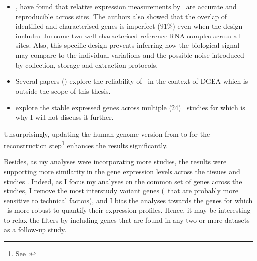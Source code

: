 \begin{itemize}[topsep=0pt,nosep]
subsets of \gtex\ and \tcga\ raw data that they have quantified \mRNAs\ at
transcript levels with  (hg19).
They have corrected for the study effect with 
and have released the normalised data to the community.
Note that \egxa\ provides more recent versions of the \gtex\ and \tcga\
(as a part of the \pcawg\ project\footnote{\pcawg\ project
analyses conjointly all available kind of research data related to cancer}) data.
\item\hspace{-1mm}, have found that relative expression measurements
by \Rnaseq\ are accurate and reproducible across sites.
The authors also showed that the overlap of identified and characterised genes
is imperfect ($91$\%)
even when the design includes
the same two well-characterised reference RNA samples across all sites.
Also,
this specific design prevents inferring how the biological signal
may compare to the individual variations and the possible noise introduced
by collection, storage and extraction protocols.
\item Several papers (\cite{Khang2015-qt,ruvseqComQN,Rau2014-va})
    explore the reliability of \Rnaseq\ in the context of
    \gls{DGEA} which is outside the scope of this thesis.
\item\cite{Zhuo2016-qi} explore the stable expressed genes across multiple
    (24) \Rnaseq\ studies for \species{Arabidopsis}
    which is why I will not discuss it further.
\end{itemize}

\vspace{2.5mm}
Unsurprisingly,
updating the human genome version from  to 
for the reconstruction
step\footnote{See : }
enhances the results significantly.

\vspace{2.5mm}
Besides, as my analyses were incorporating more studies,
the results were supporting more similarity in the gene expression levels across
the tissues and studies%
.
Indeed, as I focus my analyses on the common set of genes across the studies,
I remove the most interstudy variant genes
(\ie\ that are probably more sensitive to technical factors), and
I bias the analyses towards the genes
for which \Rnaseq\ is more robust to quantify their expression profiles.
Hence, it may be interesting to relax the filters by including genes
that are found in any two or more datasets as a follow-up study.

